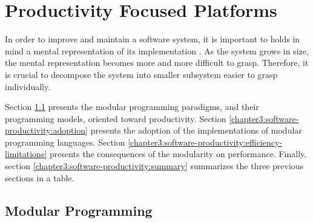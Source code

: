 \section{Productivity Focused Platforms} \label{chapter3:software-productivity}


In order to improve and maintain a software system, it is important to holds in mind a mental representation of its implementation \cite{Simon1962}.
As the system grows in size, the mental representation becomes more and more difficult to grasp.
Therefore, it is crucial to decompose the system into smaller subsystem easier to grasp individually.


Section \ref{chapter3:software-productivity:modularity} presents the modular programming paradigms, and their programming models, oriented toward productivity.
Section \ref{chapter3:software-productivity:adoption} presents the adoption of the implementations of modular programming languages.
Section \ref{chapter3:software-productivity:efficiency-limitations} presents the consequences of the modularity on performance.
Finally, section \ref{chapter3:software-productivity:summary} summarizes the three previous sections in a table.

\subsection{Modular Programming} \label{chapter3:software-productivity:modularity}

\begin{figure}[h!]
%
\end{figure}

